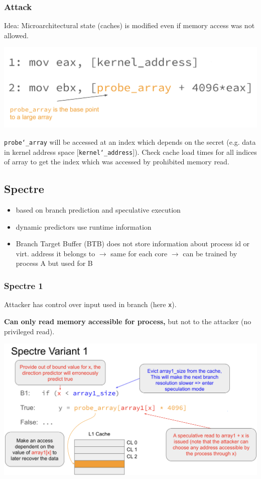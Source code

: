 \subsubsection{Attack}
Idea: Microarchitectural state (caches) is modified even if memory access was not allowed.

\begin{center}
    \includegraphics[width=0.8\linewidth]{images/meltdown-cache.png}
\end{center}

\texttt{probe\char`_array} will be accessed at an index which depends on the
secret (e.g. data in kernel address space $[$\texttt{kernel\char`_address}$]$).
Check cache load times for all indices of array to get the index which was accessed by prohibited memory read.

\subsection{Spectre}
\begin{itemize}
    \item based on branch prediction and speculative execution
    \item dynamic predictors use runtime information
    \item Branch Target Buffer (BTB) does not store information about process id or virt. address it belongs to $\xrightarrow{}$ same for each core $\xrightarrow{}$ can be trained by process A but used for B
\end{itemize}

\subsubsection{Spectre 1}
Attacker has control over input used in branch (here \texttt{x}).

\textbf{Can only read memory accessible for process,} but not to the attacker (no privileged read).

\begin{center}
    \includegraphics[width=\linewidth]{images/spectre1-overview.png}
\end{center}

